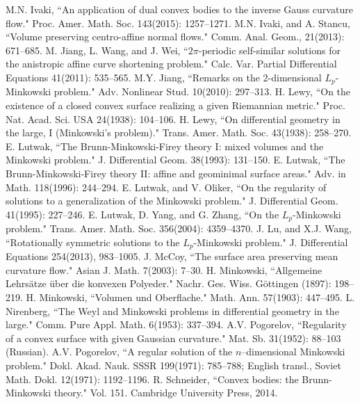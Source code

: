 \documentclass{amsart}
\theoremstyle{definition}
\theoremstyle{remark}
\numberwithin{equation}{section}
\begin{document}
\begin{thebibliography}{10}
 M.N. Ivaki, ``An application of dual convex bodies to the inverse Gauss curvature flow." Proc. Amer. Math. Soc. 143(2015): 1257--1271.
 M.N. Ivaki, and A. Stancu, ``Volume preserving centro-affine normal flows." Comm. Anal. Geom., 21(2013): 671--685.
  M. Jiang, L. Wang, and J. Wei, ``$2\pi$-periodic self-similar solutions for the anistropic affine curve shortening problem." Calc. Var. Partial Differential Equations 41(2011): 535--565.
 M.Y. Jiang, ``Remarks on the 2-dimensional $L_p$-Minkowski problem." Adv. Nonlinear Stud. 10(2010): 297--313.
H. Lewy, ``On the existence of a closed convex surface realizing a given Riemannian metric." Proc. Nat. Acad. Sci. USA 24(1938): 104--106.
H. Lewy, ``On differential geometry in the large, I (Minkowski's problem)." Trans. Amer. Math. Soc. 43(1938): 258--270.
 E. Lutwak, ``The Brunn-Minkowski-Firey theory I: mixed volumes and the Minkowski problem." J. Differential Geom. 38(1993): 131--150.
 E. Lutwak, ``The Brunn-Minkowski-Firey theory II: affine and geominimal surface areas." Adv. in Math. 118(1996): 244--294.
 E. Lutwak, and V. Oliker, ``On the regularity of solutions to a generalization of the Minkowski problem." J. Differential Geom. 41(1995): 227--246.
 E. Lutwak, D. Yang,  and G. Zhang, ``On the $L_p$-Minkowski problem." Trans. Amer. Math. Soc. 356(2004): 4359--4370.
  J. Lu, and X.J. Wang, ``Rotationally symmetric solutions to the $L_p$-Minkowski problem." J. Differential Equations 254(2013), 983--1005.
 J. McCoy, ``The surface area preserving mean curvature flow." Asian J. Math. 7(2003): 7--30.
 H. Minkowski, ``Allgemeine Lehrs\"{a}tze \"{u}ber die konvexen Polyeder." Nachr. Ges. Wiss. G\"{o}ttingen (1897): 198--219.
 H. Minkowski, ``Volumen und Oberflache." Math. Ann. 57(1903): 447--495.
  L. Nirenberg, ``The Weyl and Minkowski problems in differential geometry in the large." Comm. Pure Appl. Math. 6(1953): 337--394.
 A.V. Pogorelov, ``Regularity of a convex surface with given Gaussian curvature." Mat. Sb. 31(1952): 88--103 (Russian).
 A.V. Pogorelov, ``A regular solution of the $n$–dimensional Minkowski problem." Dokl. Akad. Nauk. SSSR 199(1971): 785--788; English transl., Soviet Math. Dokl. 12(1971): 1192--1196.
 R. Schneider, ``Convex bodies: the Brunn-Minkowski theory." Vol. 151. Cambridge University Press, 2014.

\end{thebibliography}
\end{document}
